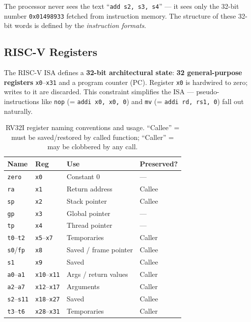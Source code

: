 \documentclass[9pt, a4paper]{extarticle}
\begin{document}
The processor never sees the text ``\texttt{add s2, s3, s4}'' --- it sees only the 32-bit number \texttt{0x01498933} fetched from instruction memory. The structure of these 32-bit words is defined by the \emph{instruction formats}.

\subsection{RISC-V Registers}

The RISC-V ISA defines a \textbf{32-bit architectural state}: \textbf{32 general-purpose registers} \texttt{x0}--\texttt{x31} and a program counter (PC). Register \texttt{x0} is hardwired to zero; writes to it are discarded. This constraint simplifies the ISA --- pseudo-instructions like \texttt{nop} (= \texttt{addi x0, x0, 0}) and \texttt{mv} (= \texttt{addi rd, rs1, 0}) fall out naturally.

\begin{table}[htbp]
\centering\small
\begin{tabular}{@{}l l l l@{}}
    \toprule
    Name & Reg & Use & Preserved? \\
    \midrule
    \texttt{zero} & \texttt{x0} & Constant 0 & --- \\
    \texttt{ra} & \texttt{x1} & Return address & Callee \\
    \texttt{sp} & \texttt{x2} & Stack pointer & Callee \\
    \texttt{gp} & \texttt{x3} & Global pointer & --- \\
    \texttt{tp} & \texttt{x4} & Thread pointer & --- \\
    \texttt{t0}--\texttt{t2} & \texttt{x5}--\texttt{x7} & Temporaries & Caller \\
    \texttt{s0}/\texttt{fp} & \texttt{x8} & Saved / frame pointer & Callee \\
    \texttt{s1} & \texttt{x9} & Saved & Callee \\
    \texttt{a0}--\texttt{a1} & \texttt{x10}--\texttt{x11} & Args / return values & Caller \\
    \texttt{a2}--\texttt{a7} & \texttt{x12}--\texttt{x17} & Arguments & Caller \\
    \texttt{s2}--\texttt{s11} & \texttt{x18}--\texttt{x27} & Saved & Callee \\
    \texttt{t3}--\texttt{t6} & \texttt{x28}--\texttt{x31} & Temporaries & Caller \\
    \bottomrule
\end{tabular}
\caption{RV32I register naming conventions and usage. ``Callee'' = must be saved/restored by called function; ``Caller'' = may be clobbered by any call.}
\label{tab:rv32-regs}
\end{table}
\end{document}
